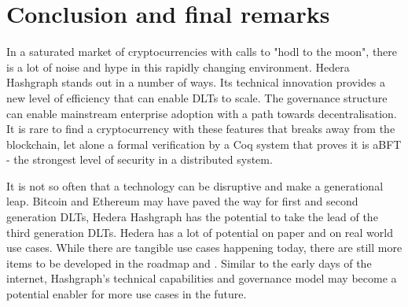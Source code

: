 \section{Conclusion and final remarks}

In a saturated market of cryptocurrencies with calls to "hodl to the moon", there is a lot of noise and hype in this rapidly changing environment. Hedera Hashgraph stands out in a number of ways. Its technical innovation provides a new level of efficiency that can enable DLTs to scale. The governance structure can enable mainstream enterprise adoption with a path towards decentralisation. It is rare to find a cryptocurrency with these features that breaks away from the blockchain, let alone a formal verification by a Coq system that proves it is aBFT - the strongest level of security in a distributed system.

It is not so often that a technology can be disruptive and make a generational leap. Bitcoin and Ethereum may have paved the way for first and second generation DLTs, Hedera Hashgraph has the potential to take the lead of the third generation DLTs. Hedera has a lot of potential on paper and on real world use cases. While there are tangible use cases happening today, there are still more items to be developed in the roadmap and . Similar to the early days of the internet, Hashgraph's technical capabilities and governance model may become a potential enabler for more use cases in the future.
